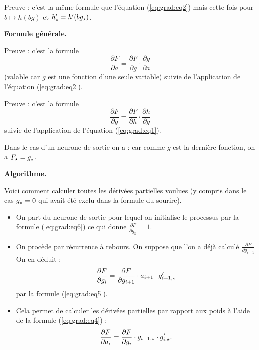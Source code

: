 {
Preuve : c'est la même formule que l'équation (\ref{eq:grad:eq2}) mais cette fois pour $b \mapsto h(b g)$ et $h'_\star = h'(b g_\star)$.

\bigskip
\textbf{Formule générale.}


Preuve :
c'est la formule
$$\frac{\partial F}{\partial a} =  \frac{\partial F}{\partial g} \cdot \frac{\partial g}{\partial a}$$
(valable car $g$ est une fonction d'une seule variable) suivie de l'application de l'équation (\ref{eq:grad:eq2}).


Preuve :
c'est la formule
$$\frac{\partial F}{\partial g} =  \frac{\partial F}{\partial h} \cdot \frac{\partial h}{\partial g}$$
suivie de l'application de l'équation (\ref{eq:grad:eq1}).

Dans le cas d'un neurone de sortie on a :
car comme $g$ est la dernière fonction, on a $F_\star = g_\star$.

\bigskip
\textbf{Algorithme.}


Voici comment calculer toutes les dérivées partielles voulues (y compris dans le cas $g_\star=0$ qui avait été exclu dans la formule du sourire).
\begin{itemize}
	\item On part du neurone de sortie pour lequel on initialise le processus par la formule
	(\ref{eq:grad:eq6}) ce qui donne 
	$\frac{\partial F}{\partial g_n} = 1$.
	\item On procède par récurrence à rebours. On suppose que l'on a déjà calculé
	$\frac{\partial F}{\partial g_{i+1}}$
	On en déduit :
	$$\frac{\partial F}{\partial g_{i}} =  \frac{\partial F}{\partial g_{i+1}} \cdot a_{i+1} \cdot  g'_{i+1,\star}$$
	par la formule (\ref{eq:grad:eq5}).
	\item Cela permet de calculer les dérivées partielles par rapport aux poids à l'aide de la formule (\ref{eq:grad:eq4}) :
	$$\frac{\partial F}{\partial a_i} = \frac{\partial F}{\partial g_i} \cdot g_{i-1,\star} \cdot  g'_{i,\star}.$$
\end{itemize}



}
